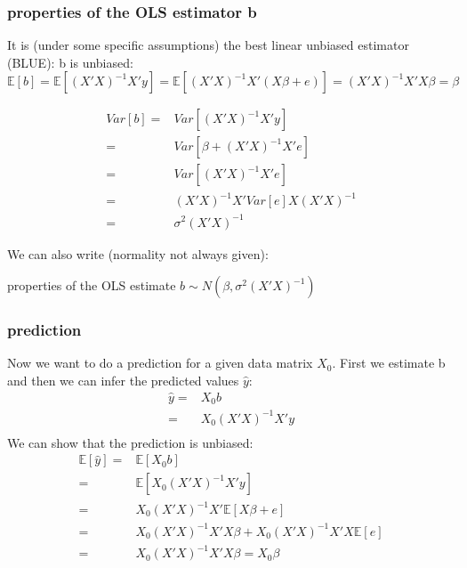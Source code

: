 \documentclass{beamer}
\begin{document}
\begin{frame}
\frametitle{properties of the OLS estimator b}
It is (under some specific assumptions) the best linear unbiased estimator (BLUE):
\newline
b is unbiased:
\begin{equation*}
\mathbb{E}[b] = \mathbb{E}[(X'X)^{-1}X'y] = \mathbb{E}[(X'X)^{-1}X'(X\beta +e)] = (X'X)^{-1}X'X\beta = \beta
\end{equation*}


\begin{align*} 
Var[b] =& Var[(X'X)^{-1}X'y]\\
=& Var[\beta + (X'X)^{-1}X'e]\\
=&Var[(X'X)^{-1}X'e] \\
=& (X'X)^{-1}X' Var[e] X (X'X)^{-1} \\
=&  \sigma^2(X'X)^{-1}
\end{align*}

We can also write (normality not always given):
\begin{block}{properties of the OLS estimate}
$ b \sim N(\beta , \sigma^2(X'X)^{-1} ) $
\end{block}

\end{frame}

\begin{frame}
\frametitle{prediction}
Now we want to do a prediction for a given data matrix $X_0$. First we estimate b and then we can infer the predicted values $\hat{y}$:
\begin{align*} 
\hat{y} =& X_0 b \\
=& X_0 (X'X)^{-1}X'y \\
\end{align*}
We can show that the prediction is unbiased:
\begin{align*} 
\mathbb{E}[\hat{y}] = & \mathbb{E}[X_0 b] \\
=&\mathbb{E}[ X_0 (X'X)^{-1}X'y ]\\
=& X_0 (X'X)^{-1}X' \mathbb{E}[ X\beta +e ]\\
=& X_0 (X'X)^{-1}X'X\beta +  X_0 (X'X)^{-1}X'X\mathbb{E}[e ]\\
=& X_0 (X'X)^{-1}X'X\beta = X_0 \beta \\
\end{align*}
\end{frame}
\end{document}
